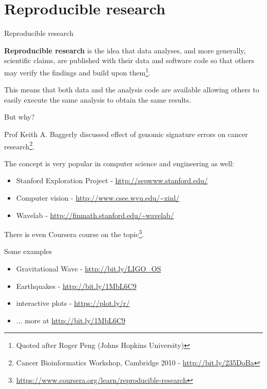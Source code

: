 \documentclass[11pt]{beamer}
\begin{document}
\section{Reproducible research}

\begin{frame}[fragile]{Reproducible research}

\textbf{Reproducible research} is the idea that data analyses, and more generally, scientific claims, are published with their data and software code so that others may verify the findings and build upon them\footnote[frame]{Quoted after Roger Peng (Johns Hopkins University)}.

\bigskip
This means that both data and the analysis code are available allowing others to easily execute the same analysis to obtain the same results.

\end{frame}

\begin{frame}[fragile]{But why?}

Prof Keith A. Baggerly discussed effect of genomic signature errors on cancer research\footnote{Cancer Bioinformatics Workshop, Cambridge 2010 - \url{http://bit.ly/235DoBa}}.

The concept is very popular in computer science and engineering as well:

\begin{itemize}
	\item Stanford Exploration Project - \url{http://sepwww.stanford.edu/}
	\item Computer vision - \url{http://www.csee.wvu.edu/~xinl/}
	\item Wavelab - \url{http://finmath.stanford.edu/~wavelab/}
\end{itemize}

There is even Coursera course on the topic\footnote{\url{https://www.coursera.org/learn/reproducible-research}}.

\end{frame}


\begin{frame}[fragile]{Some examples}


\begin{itemize}
	\item Gravitational Wave - \url{http://bit.ly/LIGO_OS}
	\item Earthquakes - \url{http://bit.ly/1MbL6C9}
	\item interactive plots - \url{https://plot.ly/r/}
	\item ... more at \url{http://bit.ly/1MbL6C9}
\end{itemize}

\end{frame}
\end{document}
